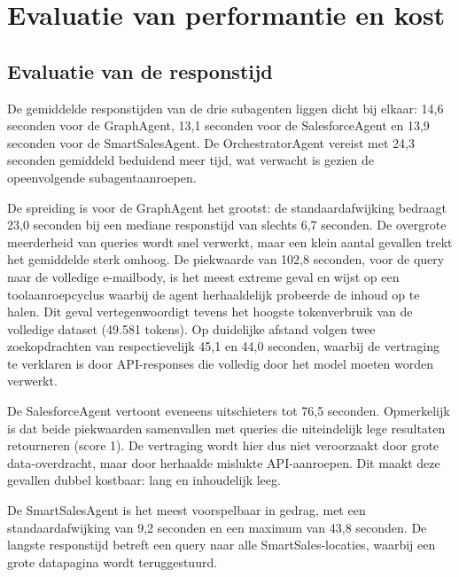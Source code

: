 \section{Evaluatie van performantie en kost}
\label{sec:evaluatie-performantie}

\subsection{Evaluatie van de responstijd}
\label{subsec:responstijd}


De gemiddelde responstijden van de drie subagenten liggen dicht bij elkaar: 14,6 seconden voor de GraphAgent, 13,1 seconden voor de SalesforceAgent en 13,9 seconden voor de SmartSalesAgent. De OrchestratorAgent vereist met 24,3 seconden gemiddeld beduidend meer tijd, wat verwacht is gezien de opeenvolgende subagentaanroepen.

De spreiding is voor de GraphAgent het grootst: de standaardafwijking bedraagt 23,0 seconden bij een mediane responstijd van slechts 6,7 seconden. De overgrote meerderheid van queries wordt snel verwerkt, maar een klein aantal gevallen trekt het gemiddelde sterk omhoog. De piekwaarde van 102,8 seconden, voor de query naar de volledige e-mailbody, is het meest extreme geval en wijst op een toolaanroepcyclus waarbij de agent herhaaldelijk probeerde de inhoud op te halen. Dit geval vertegenwoordigt tevens het hoogste tokenverbruik van de volledige dataset (49.581 tokens). Op duidelijke afstand volgen twee zoekopdrachten van respectievelijk 45,1 en 44,0 seconden, waarbij de vertraging te verklaren is door API-responses die volledig door het model moeten worden verwerkt.

De SalesforceAgent vertoont eveneens uitschieters tot 76,5 seconden. Opmerkelijk is dat beide piekwaarden samenvallen met queries die uiteindelijk lege resultaten retourneren (score 1). De vertraging wordt hier dus niet veroorzaakt door grote data-overdracht, maar door herhaalde mislukte API-aanroepen. Dit maakt deze gevallen dubbel kostbaar: lang en inhoudelijk leeg.

De SmartSalesAgent is het meest voorspelbaar in gedrag, met een standaardafwijking van 9,2 seconden en een maximum van 43,8 seconden. De langste responstijd betreft een query naar alle SmartSales-locaties, waarbij een grote datapagina wordt teruggestuurd.

